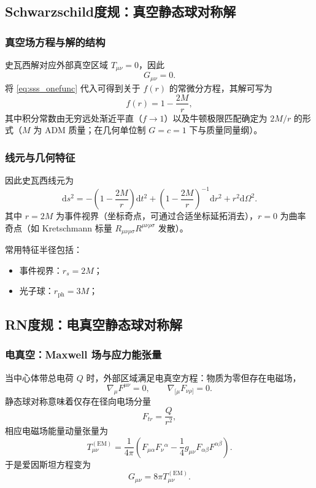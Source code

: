 \documentclass[a4paper,12pt]{article}
\begin{document}
\subsection{Schwarzschild度规：真空静态球对称解}

\subsubsection{真空场方程与解的结构}
史瓦西解对应外部真空区域 $T_{\mu\nu}=0$，因此
\begin{equation}
G_{\mu\nu}=0.
\end{equation}
将 \eqref{eq:sss_onefunc} 代入可得到关于 $f(r)$ 的常微分方程，其解可写为
\begin{equation}
f(r)=1-\frac{2M}{r},
\end{equation}
其中积分常数由无穷远处渐近平直（$f\to 1$）以及牛顿极限匹配确定为 $2M/r$ 的形式（$M$ 为 ADM 质量；在几何单位制 $G=c=1$ 下与质量同量纲）。

\subsubsection{线元与几何特征}
因此史瓦西线元为
\begin{equation}
\mathrm{d}s^2=-\left(1-\frac{2M}{r}\right)\mathrm{d}t^2+\left(1-\frac{2M}{r}\right)^{-1}\mathrm{d}r^2+r^2\mathrm{d}\Omega^2.
\end{equation}
其中 $r=2M$ 为事件视界（坐标奇点，可通过合适坐标延拓消去），$r=0$ 为曲率奇点（如 Kretschmann 标量 $R_{\mu\nu\rho\sigma}R^{\mu\nu\rho\sigma}$ 发散）。

常用特征半径包括：
\begin{itemize}
\item 事件视界：$r_s=2M$；
\item 光子球：$r_{\mathrm{ph}}=3M$；
\end{itemize}

\subsection{RN度规：电真空静态球对称解}

\subsubsection{电真空：Maxwell 场与应力能张量}
当中心体带总电荷 $Q$ 时，外部区域满足电真空方程：物质为零但存在电磁场，
\begin{equation}
\nabla_\mu F^{\mu\nu}=0,\qquad \nabla_{[\mu}F_{\nu\rho]}=0.
\end{equation}
静态球对称意味着仅存在径向电场分量
\begin{equation}
F_{tr}=\frac{Q}{r^2},
\end{equation}
相应电磁场能量动量张量为
\begin{equation}
T_{\mu\nu}^{(\mathrm{EM})}
=\frac{1}{4\pi}\left(F_{\mu\alpha}F_{\nu}{}^{\alpha}-\frac{1}{4}g_{\mu\nu}F_{\alpha\beta}F^{\alpha\beta}\right).
\end{equation}
于是爱因斯坦方程变为
\begin{equation}
G_{\mu\nu}=8\pi T_{\mu\nu}^{(\mathrm{EM})}.
\end{equation}
\end{document}
